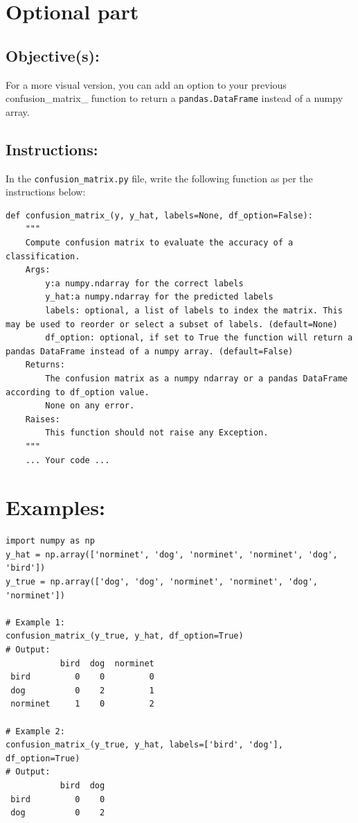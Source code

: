 \documentclass{42-en}
\begin{document}
\section{Optional part}

\subsection{Objective(s):}

For a more visual version, you can add an option to your previous confusion\_matrix\_ function to return a \texttt{pandas.DataFrame} instead of a numpy array.

\subsection{Instructions:}

In the \texttt{confusion\_matrix.py} file, write the following function as per the instructions below:
\begin{verbatim}
def confusion_matrix_(y, y_hat, labels=None, df_option=False):
    """
    Compute confusion matrix to evaluate the accuracy of a classification.
    Args:
        y:a numpy.ndarray for the correct labels
        y_hat:a numpy.ndarray for the predicted labels
        labels: optional, a list of labels to index the matrix. This may be used to reorder or select a subset of labels. (default=None)
        df_option: optional, if set to True the function will return a pandas DataFrame instead of a numpy array. (default=False)
    Returns: 
        The confusion matrix as a numpy ndarray or a pandas DataFrame according to df_option value.
        None on any error.
    Raises:
        This function should not raise any Exception.
    """
    ... Your code ...
\end{verbatim}

\section{Examples:}
\begin{verbatim}
import numpy as np
y_hat = np.array(['norminet', 'dog', 'norminet', 'norminet', 'dog', 'bird'])
y_true = np.array(['dog', 'dog', 'norminet', 'norminet', 'dog', 'norminet'])

# Example 1: 
confusion_matrix_(y_true, y_hat, df_option=True)
# Output:
           bird  dog  norminet
 bird         0    0         0
 dog          0    2         1
 norminet     1    0         2

# Example 2:
confusion_matrix_(y_true, y_hat, labels=['bird', 'dog'], df_option=True)
# Output:
           bird  dog
 bird         0    0
 dog          0    2
\end{verbatim}
\end{document}
